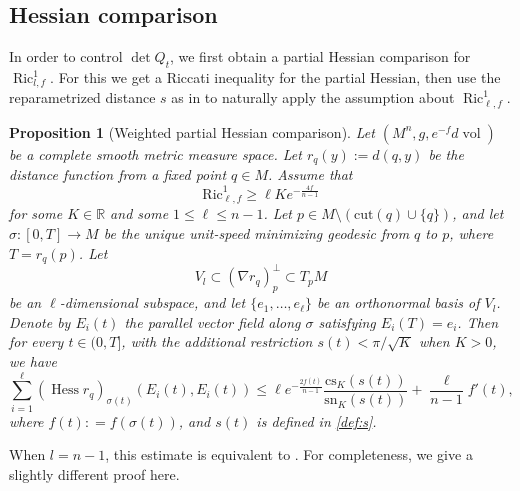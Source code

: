 \documentclass[psamsfonts]{amsart}
\newtheorem{prop}[thm]{Proposition}
\theoremstyle{definition}
\theoremstyle{remark}
\DeclareMathOperator{\Ric}{Ric}
\numberwithin{equation}{section}
\begin{document}
\subsection{Hessian comparison}
    In order to control $\operatorname{det} Q_t$, we first obtain a partial Hessian comparison for $\Ric_{l,f}^1$. 
    For this we get a Riccati inequality for the partial Hessian,
     then use the reparametrized distance $s$ as in \cite{wylie2016geometry} to naturally apply the assumption about $\Ric_{\ell, f}^1$. 

        \begin{prop}[Weighted partial Hessian comparison]\label{prop-weighted hessian}
        Let $(M^n,g,e^{-f}d\operatorname{vol})$ be a complete smooth metric measure space.
        Let
        $r_q(y):=d(q,y)$ be the distance function from a fixed point $q \in M$.
        Assume that
        \begin{equation}\label{Curvature-assumption}
        \mathrm{Ric}_{\ell,f}^1 \geq \ell K e^{-\frac{4f}{n-1}}
        \end{equation}
        for some $ K \in \mathbb{R}$ and some $1\leq \ell\leq n-1$.
        Let $p \in M \setminus (\mathrm{cut}(q)\cup \{q\})$, and let $\sigma:[0,T] \to M$ be the unique unit-speed minimizing geodesic from $q$ to $p$, where $T = r_q(p)$. Let $$V_l \subset (\nabla r_q)_{p}^\perp \subset T_p M$$ be an $\ell$-dimensional subspace, and let $\{e_1, \ldots, e_\ell\}$ be an orthonormal basis of $V_l$. Denote by $E_i(t)$ the parallel vector field along $\sigma$ satisfying $E_i(T) = e_i$.
        Then for every $t \in (0,T]$, with the additional restriction
        $s(t)< \pi / \sqrt{K}$ when $K>0$, 
        we have
        $$\sum_{i=1}^\ell (\operatorname{Hess} r_q)_{\sigma(t)}(E_i(t), E_i(t)) \leq \ell e^{-\frac{2f(t)}{n-1}} \frac{\mathrm{cs}_K(s(t))}{\mathrm{sn}_K(s(t))} + \frac{\ell}{n-1} f'(t),$$
        where $f(t) : = f(\sigma(t))$, and $s(t)$ is defined in \eqref{def:s}.
        \end{prop}
 When $l = n-1$, this estimate is equivalent to \cite[Lemma 4.2]{wylie2016geometry}. For completeness, we give a slightly different proof here. 
 
\end{document}
